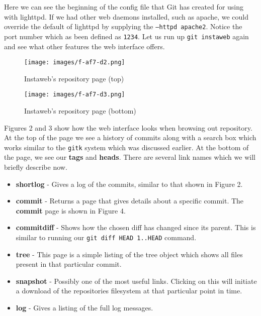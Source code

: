 Here we can see the beginning of the config file that Git has created for using with lighttpd.
If we had other web daemons installed, such as apache, we could override the default of lighttpd by supplying the \texttt{--httpd apache2}.
Notice the port number which as been defined as \texttt{1234}.
Let us run up \texttt{git instaweb} again and see what other features the web interface offers.

\begin{figure}[hbt]
\centering
\texttt{[image: images/f-af7-d2.png]}
\caption{Instaweb's repository page (top)}
\end{figure}

\begin{figure}[hbt]
\centering
\texttt{[image: images/f-af7-d3.png]}
\caption{Instaweb's repository page (bottom)}
\end{figure}

Figures 2 and 3 show how the web interface looks when browsing out repository.
At the top of the page we see a history of commits along with a search box which works similar to the \texttt{gitk} system which was discussed earlier.
At the bottom of the page, we see our \textbf{tags} and \textbf{heads}.
There are several link names which we will briefly describe now.

\begin{itemize}
\item {}\textbf{shortlog} - Gives a log of the commits, similar to that shown in Figure 2.
\item {}\textbf{commit} - Returns a page that gives details about a specific commit.
The \textbf{commit} page is shown in Figure 4.
\item {}\textbf{commitdiff} - Shows how the chosen diff has changed since its parent.  
This is similar to running our \texttt{git diff HEAD~1..HEAD} command.
\item {}\textbf{tree} - This page is a simple listing of the tree object which shows all files present in that particular commit.
\item {}\textbf{snapshot} - Possibly one of the most useful links.
Clicking on this will initiate a download of the repositories filesystem at that particular point in time.
\item {}\textbf{log} - Gives a listing of the full log messages.
\end{itemize}

